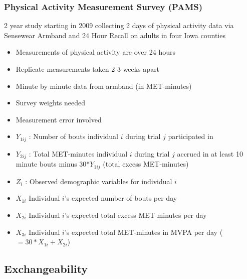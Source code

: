 \documentclass[handout]{beamer}\usepackage[]{graphicx}\usepackage[]{color}
\begin{document}
\begin{frame}
\frametitle{Physical Activity Measurement Survey (PAMS)}
2 year study starting in 2009 collecting 2 days of physical activity data via Sensewear Armband and 24 Hour Recall on adults in four Iowa counties

\begin{itemize}
\item
Measurements of physical activity are over 24 hours
\item
Replicate measurements taken 2-3 weeks apart
\item
Minute by minute data from armband (in MET-minutes)
\item
Survey weights needed 
\item
Measurement error involved
\end{itemize}

\end{frame}


\begin{frame}


\begin{itemize}
\item
$Y_{1ij}$ : Number of bouts individual $i$ during trial $j$ participated in
\item
$Y_{2ij}$ : Total MET-minutes individual $i$ during trial $j$ accrued in at least 10 minute bouts minus 30*$Y_{1ij}$  (total excess MET-minutes)
\item
$Z_i$ : Observed demographic variables for individual $i$
\item
$X_{1i}$ Individual $i$'s expected number of bouts per day
\item
$X_{2i}$ Individual $i$'s expected total excess MET-minutes per day
\item
$X_{3i}$ Individual $i$'s expected total MET-minutes in MVPA per day ($= 30*X_{1i}+X_{2i}$)
\end{itemize}

\end{frame}

\subsection{Exchangeability}
\end{document}
